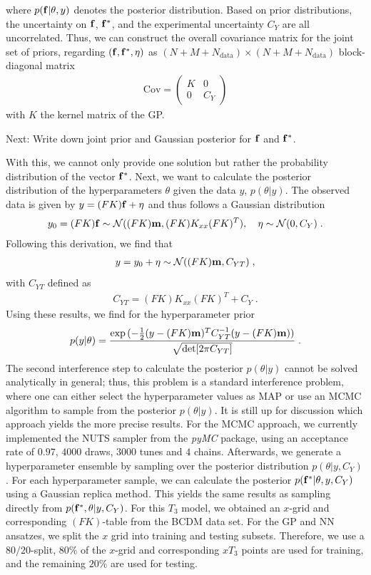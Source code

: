 \documentclass[11pt,a4paper]{article}
\begin{document}
%
where $p(\mathbf{f}|\theta, y)$ denotes the posterior distribution. Based on prior distributions, the uncertainty on $\mathbf{f}$, $\mathbf{f^*}$, and the experimental uncertainty $C_Y$ are all uncorrelated. Thus, we can construct the overall covariance matrix for the joint set of priors, regarding $(\mathbf{f}, \mathbf{f^*}, \eta)$ as $(N+M+N_\mathrm{data})\times (N+M+N_\mathrm{data})$ block-diagonal matrix
%
\begin{align}
    \mathrm{Cov} = 
    \begin{pmatrix}
      K & 0 \\ 0 & C_Y  
    \end{pmatrix}
\end{align}
%
with $K$ the kernel matrix of the GP.

Next: Write down joint prior and Gaussian posterior for $\mathbf{f}$ and $\mathbf{f^*}$.

With this, we cannot only provide one solution but rather the probability distribution of the vector $\mathbf{f^*}$.
Next, we want to calculate the posterior distribution of the hyperparameters $\theta$ given the data $y$, $p(\theta|y)$. The observed data is given by $y = (FK)\mathbf{f} + \eta$ and thus follows a Gaussian distribution
%
\begin{align}
    y_0 = (FK)\mathbf{f} \sim \mathcal{N}((FK)\mathbf{m}, (FK)K_{xx}(FK)^T), \quad \eta \sim \mathcal{N}(0, C_Y) \; .
\end{align}
%
Following this derivation, we find that
%
\begin{align}
    y = y_0 + \eta \sim \mathcal{N}((FK)\mathbf{m}, C_{YT}) \; ,
\end{align}
%
with $C_{YT}$ defined as
%
\begin{align}
    C_{YT} = (FK)K_{xx}(FK)^T + C_Y \; .
\end{align}
%
Using these results, we find for the hyperparameter prior
%
\begin{align}
    p(y|\theta) = \frac{\exp{(-\frac{1}{2}(y-(FK)\mathbf{m})^T C_{YT}^{-1}(y-(FK)\mathbf{m}))}}{\sqrt{\det [2\pi C_{YT}]}} \; .
\end{align}
%
The second interference step to calculate the posterior $p(\theta|y)$ cannot be solved analytically in general; thus, this problem is a standard interference problem, where one can either select the hyperparameter values as MAP or use an MCMC algorithm to sample from the posterior $p(\theta|y)$. 
It is still up for discussion which approach yields the more precise results.
For the MCMC approach, we currently implemented the NUTS sampler from the \textit{pyMC} package, using an acceptance rate of $0.97$, $4000$ draws, $3000$ tunes and $4$ chains. 
Afterwards, we generate a hyperparameter ensemble by sampling over the posterior distribution 
$p(\theta|y, C_Y)$. For each hyperparameter sample, we can calculate the posterior $p(\mathbf{f^*}|\theta, y, C_Y)$ using a Gaussian replica method. This yields the same results as sampling directly from $p(\mathbf{f^*}, \theta |y, C_Y)$.
For this $T_3$ model, we obtained an $x$-grid and corresponding $(FK)$-table from the BCDM data set. For the GP and NN ansatzes, we split the $x$ grid into training and testing subsets. Therefore, we use a $80/20$-split, $80\%$ of the $x$-grid and corresponding $xT_3$ points are used for training, and the remaining $20\%$ are used for testing. 
%
\end{document}
